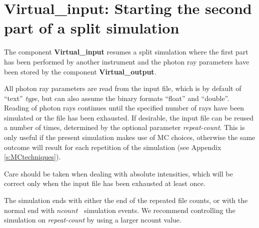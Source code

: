 \section{Virtual\_input: Starting the second part of a split simulation}
\label{s:virtual-input}

The component \textbf{Virtual\_input} resumes a split simulation where the
first part has been performed by another instrument and the photon ray
parameters have been stored by the component \textbf{Virtual\_output}.

All photon ray parameters are read from the input file, which is by default
of ``text'' \textit{type}, but can also assume the binary formats
``float'' and ``double''. Reading of photon rays continues until the
specified number of rays have been simulated or
the file has been exhausted. If desirable, the input file
can be reused a number of times, determined by the optional parameter
\textit{repeat-count}. This is only useful if the present simulation makes use of
MC choices, otherwise the same outcome will result for each repetition of the
simulation (see Appendix \ref{s:MCtechniques}).

Care should be taken when dealing with
absolute intensities, which will be correct only
when the input file has been exhausted at least once.

The simulation ends with either the end of the repeated file counts,
or with the normal end with $ncount$ \MCX\ simulation events. We recommend
controlling the simulation on \textit{repeat-count} by using
a larger ncount value.
